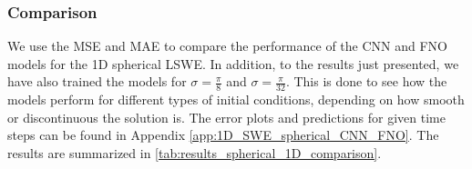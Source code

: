 \subsubsection*{Comparison}
We use the MSE and MAE to compare the performance of the CNN and FNO models for the 1D spherical LSWE.
In addition, to the results just presented, we have also trained the models for $\sigma = \frac{\pi}{8}$ and $\sigma = \frac{\pi}{32}$.
This is done to see how the models perform for different types of initial conditions, depending on how smooth or discontinuous the solution is.
The error plots and predictions for given time steps can be found in Appendix \autoref{app:1D_SWE_spherical_CNN_FNO}.
The results are summarized in \autoref{tab:results_spherical_1D_comparison}.
\begin{table}[H]
    \centering
    \small %
    \begin{tabular}{c|ccc|ccc|ccc}
        \hline


\end{tabular}
\end{table}
